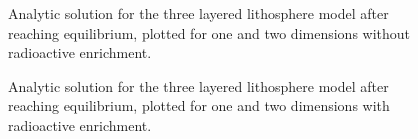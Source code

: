 \documentclass[10pt,a4paper]{article}
\begin{document}
\begin{figure} [H]
	\centering
	\caption{\label{10analyticNotEnriched}Analytic solution for the three layered lithosphere model after reaching equilibrium, plotted for one and two dimensions without radioactive enrichment. }
\end{figure}

\begin{figure} [H]
	\centering
	\caption{\label{10analyticEnriched}Analytic solution for the three layered lithosphere model after reaching equilibrium, plotted for one and two dimensions with radioactive enrichment. }
\end{figure}
\end{document}
